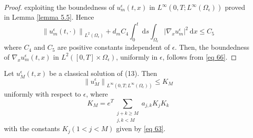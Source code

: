 \begin{proof}
exploiting the boundedness of $u_{m}^{\epsilon}(t, x)$ in $L^{\infty}\left(0, T ; L^{\infty}\left(\Omega_{\epsilon}\right)\right)$ proved in Lemma \eqref{lemma 5.5}. Hence
\begin{equation}
  \left\|u_{m}^{\epsilon}(t, \cdot)\right\|_{L^{2}\left(\Omega_{\epsilon}\right)}+d_{m} C_{4} \int_{0}^{t} \mathrm{~d} s \int_{\Omega_{\epsilon}}\left|\nabla_{x} u_{m}^{\epsilon}\right|^{2} \mathrm{~d} x \leq C_{5}
\label{eq 66}\end{equation}
where $C_{4}$ and $C_{5}$ are positive constants independent of $\epsilon$. Then, the boundedness of $\nabla_{x} u_{m}^{\epsilon}(t, x)$ in $L^{2}\left([0, T] \times \Omega_{\epsilon}\right)$, uniformly in $\epsilon$, follows from \eqref{eq 66}.
\end{proof}
\begin{lemma} Let $u_{M}^{\epsilon}(t, x)$ be a classical solution of (13). Then
$$
\left\|u_{M}^{\epsilon}\right\|_{L^{\infty}\left(0, T ; L^{\infty}\left(\Omega_{\epsilon}\right)\right)} \leq K_{M}
$$
uniformly with respect to $\epsilon$, where
$$
K_{M}=e^{T} \sum_{\substack{j+k \geq M \\
j,k<M}} a_{j, k} K_{j} K_{k}
$$
with the constants $K_{j}(1<j<M)$ given by \eqref{eq 63}.
\label{lemma 5.7}\end{lemma}
